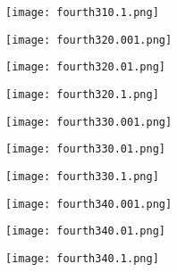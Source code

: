 \documentclass[12pt]{article}
\begin{document}
\begin{figure}[H]

	\centering
	\begin{minipage}{.5\textwidth}
		\centering
		\texttt{[image: fourth310.1.png]}
	\end{minipage}%
	\begin{minipage}{.5\textwidth}
		\centering
		\texttt{[image: fourth320.001.png]}
	\end{minipage}
\end{figure}

\begin{figure}[H]

	\centering
	\begin{minipage}{.5\textwidth}
		\centering
		\texttt{[image: fourth320.01.png]}
	\end{minipage}%
	\begin{minipage}{.5\textwidth}
		\centering
		\texttt{[image: fourth320.1.png]}
	\end{minipage}
\end{figure}





\begin{figure}[H]

	\centering
	\begin{minipage}{.5\textwidth}
		\centering
		\texttt{[image: fourth330.001.png]}
	\end{minipage}%
	\begin{minipage}{.5\textwidth}
		\centering
		\texttt{[image: fourth330.01.png]}
	\end{minipage}
\end{figure}

\begin{figure}[H]

	\centering
	\begin{minipage}{.5\textwidth}
		\centering
		\texttt{[image: fourth330.1.png]}
	\end{minipage}%
	\begin{minipage}{.5\textwidth}
		\centering
		\texttt{[image: fourth340.001.png]}
	\end{minipage}
\end{figure}

\begin{figure}[H]

	\centering
	\begin{minipage}{.5\textwidth}
		\centering
		\texttt{[image: fourth340.01.png]}
	\end{minipage}%
	\begin{minipage}{.5\textwidth}
		\centering
		\texttt{[image: fourth340.1.png]}
	\end{minipage}
\end{figure}
\end{document}
